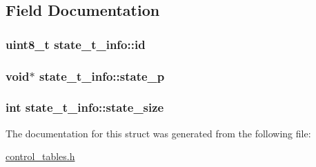 \subsection{\-Field \-Documentation}
\hypertarget{structstate__t__info_ae955a81f5474b2457a6aa82ea183eab8}{
\subsubsection[{id}]{\setlength{\rightskip}{0pt plus 5cm}uint8\-\_\-t {\bf state\-\_\-t\-\_\-info\-::id}}}
\label{structstate__t__info_ae955a81f5474b2457a6aa82ea183eab8}
\hypertarget{structstate__t__info_abf22bd945b57e8c3317a73c618f13aca}{
\subsubsection[{state\-\_\-p}]{\setlength{\rightskip}{0pt plus 5cm}void$\ast$ {\bf state\-\_\-t\-\_\-info\-::state\-\_\-p}}}
\label{structstate__t__info_abf22bd945b57e8c3317a73c618f13aca}
\hypertarget{structstate__t__info_a8831bb5e2e85d6aa8906e984c60c354e}{
\subsubsection[{state\-\_\-size}]{\setlength{\rightskip}{0pt plus 5cm}int {\bf state\-\_\-t\-\_\-info\-::state\-\_\-size}}}
\label{structstate__t__info_a8831bb5e2e85d6aa8906e984c60c354e}


\-The documentation for this struct was generated from the following file\-:\begin{DoxyCompactItemize}
\item 
\hyperlink{control__tables_8h}{control\-\_\-tables.\-h}\end{DoxyCompactItemize}
